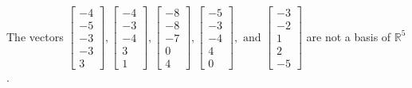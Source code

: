 \begin{exercise}
\begin{exerciseStatement}
  \end{exerciseStatement}
  \begin{exerciseAnswer}
   The vectors \(\left[\begin{array}{r}
-4 \\
-5 \\
-3 \\
-3 \\
3
\end{array}\right] , \left[\begin{array}{r}
-4 \\
-3 \\
-4 \\
3 \\
1
\end{array}\right] , \left[\begin{array}{r}
-8 \\
-8 \\
-7 \\
0 \\
4
\end{array}\right] , \left[\begin{array}{r}
-5 \\
-3 \\
-4 \\
4 \\
0
\end{array}\right] , \text{ and } \left[\begin{array}{r}
-3 \\
-2 \\
1 \\
2 \\
-5
\end{array}\right]\) 
  	 are not  a basis of \(\mathbb{R}^5\).
  


  \end{exerciseAnswer}
\end{exercise}